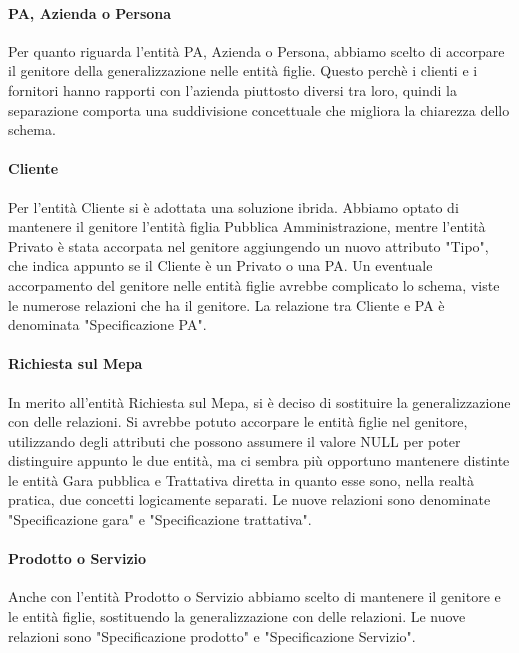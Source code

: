 \paragraph{PA, Azienda o Persona}
Per quanto riguarda l'entità PA, Azienda o Persona, abbiamo scelto di accorpare il genitore della generalizzazione nelle entità figlie. Questo perchè i clienti e i fornitori hanno rapporti con l'azienda piuttosto diversi tra loro, quindi la separazione comporta una suddivisione concettuale che migliora la chiarezza dello schema.
\paragraph{Cliente}
Per l'entità Cliente si è adottata una soluzione ibrida. Abbiamo optato di mantenere il genitore l'entità figlia Pubblica Amministrazione, mentre l'entità Privato è stata accorpata nel genitore aggiungendo un nuovo attributo "Tipo", che indica appunto se il Cliente è un Privato o una PA. Un eventuale accorpamento del genitore nelle entità figlie avrebbe complicato lo schema, viste le numerose relazioni che ha il genitore.
\newline
La relazione tra Cliente e PA è denominata "Specificazione PA".
\paragraph{Richiesta sul Mepa}
In merito all'entità Richiesta sul Mepa, si è deciso di sostituire la generalizzazione con delle relazioni. Si avrebbe potuto accorpare le entità figlie nel genitore, utilizzando degli attributi che possono assumere il valore NULL per poter distinguire appunto le due entità, ma ci sembra più opportuno mantenere distinte le entità Gara pubblica e Trattativa diretta in quanto esse sono, nella realtà pratica, due concetti logicamente separati.
Le nuove relazioni sono denominate "Specificazione gara" e "Specificazione trattativa".
\paragraph{Prodotto o Servizio}
Anche con l'entità Prodotto o Servizio abbiamo scelto di mantenere il genitore e le entità figlie, sostituendo la generalizzazione con delle relazioni. Le nuove relazioni sono "Specificazione prodotto" e "Specificazione Servizio".
